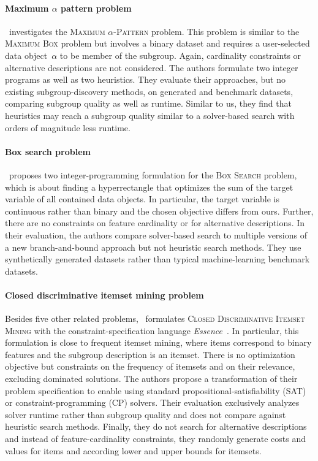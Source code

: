 \documentclass{article}
\theoremstyle{definition}
\begin{document}
\paragraph{Maximum $\alpha$ pattern problem}

\cite{bonates2008maximum}~investigates the \textsc{Maximum $\alpha$-Pattern} problem.
This problem is similar to the \textsc{Maximum Box} problem but involves a binary dataset and requires a user-selected data object~$\alpha$ to be member of the subgroup.
Again, cardinality constraints or alternative descriptions are not considered.
The authors formulate two integer programs as well as two heuristics.
They evaluate their approaches, but no existing subgroup-discovery methods, on generated and benchmark datasets, comparing subgroup quality as well as runtime.
Similar to us, they find that heuristics  may reach a subgroup quality similar to a solver-based search with orders of magnitude less runtime.

\paragraph{Box search problem}

\cite{louveaux2014combinatorial}~proposes two integer-programming formulation for the \textsc{Box Search} problem, which is about finding a hyperrectangle that optimizes the sum of the target variable of all contained data objects.
In particular, the target variable is continuous rather than binary and the chosen objective differs from ours.
Further, there are no constraints on feature cardinality or for alternative descriptions.
In their evaluation, the authors compare solver-based search to multiple versions of a new branch-and-bound approach but not heuristic search methods.
They use synthetically generated datasets rather than typical machine-learning benchmark datasets.

\paragraph{Closed discriminative itemset mining problem}

Besides five other related problems, \cite{koccak2020exploiting}~formulates \textsc{Closed Discriminative Itemset Mining} with the constraint-specification language \emph{Essence}~\cite{frisch2008ssence}.
In particular, this formulation is close to frequent itemset mining, where items correspond to binary features and the subgroup description is an itemset.
There is no optimization objective but constraints on the frequency of itemsets and on their relevance, excluding dominated solutions.
The authors propose a transformation of their problem specification to enable using standard propositional-satisfiability (SAT) or constraint-programming (CP) solvers.
Their evaluation exclusively analyzes solver runtime rather than subgroup quality and does not compare against heuristic search methods.
Finally, they do not search for alternative descriptions and instead of feature-cardinality constraints, they randomly generate costs and values for items and according lower and upper bounds for itemsets.
\end{document}
